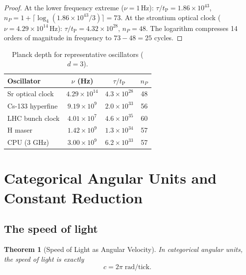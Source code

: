 \documentclass[twocolumn,10pt,a4paper]{article}
\theoremstyle{thmstyle}
\newtheorem{theorem}{Theorem}[section]
\theoremstyle{definition}
\theoremstyle{remark}
\newcommand{\tP}{t_{\mathrm{P}}}
\begin{document}
\begin{proof}
At the lower frequency extreme ($\nu = 1\,\mathrm{Hz}$):
$\tau/\tP = 1.86 \times 10^{43}$,
$n_P = 1 + \lceil\log_4(1.86 \times 10^{43}/3)\rceil = 73$.
At the strontium optical clock ($\nu = 4.29 \times 10^{14}\,\mathrm{Hz}$):
$\tau/\tP = 4.32 \times 10^{28}$,
$n_P = 48$.
The logarithm compresses 14 orders of magnitude in frequency to
$73 - 48 = 25$ cycles.
\end{proof}

\begin{table}[h]
\centering
\caption{Planck depth for representative oscillators ($d = 3$).}
\label{tab:planck}
\begin{tabular}{lccc}
\toprule
Oscillator & $\nu$ (Hz) & $\tau/\tP$ & $n_P$ \\
\midrule
Sr optical clock & $4.29 \times 10^{14}$ & $4.3 \times 10^{28}$ & 48 \\
Cs-133 hyperfine & $9.19 \times 10^{9}$ & $2.0 \times 10^{33}$ & 56 \\
LHC bunch clock  & $4.01 \times 10^{7}$ & $4.6 \times 10^{35}$ & 60 \\
H maser          & $1.42 \times 10^{9}$ & $1.3 \times 10^{34}$ & 57 \\
CPU (3 GHz)      & $3.00 \times 10^{9}$ & $6.2 \times 10^{33}$ & 57 \\
\bottomrule
\end{tabular}
\end{table}

\section{Categorical Angular Units and Constant Reduction}
\label{sec:constants}

\subsection{The speed of light}

\begin{theorem}[Speed of Light as Angular Velocity]
\label{thm:c}
In categorical angular units, the speed of light is exactly
\begin{equation}
c = 2\pi\;\mathrm{rad/tick}.
\label{eq:c}
\end{equation}
\end{theorem}
\end{document}
